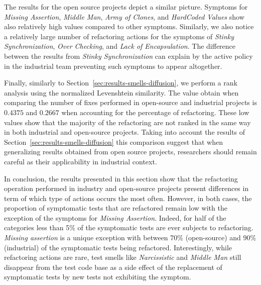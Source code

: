 The results for the open source projects depict a similar picture. Symptoms for \emph{Missing Assertion}, \emph{Middle Man}, \emph{Army of Clones}, and \emph{HardCoded Values} show also relatively high values compared to other symptoms. Similarly, we also notice a relatively large number of refactoring actions for the symptoms of \emph{Stinky Synchronization}, \emph{Over Checking}, and \emph{Lack of Encapsulation}. The difference between the results from \emph{Stinky Synchronization} can explain by the active policy in the industrial team preventing such symptoms to appear altogether.

Finally, similarly to Section~\ref{sec:results-smells-diffusion}, we perform a rank analysis using the normalized Levenshtein similarity. The value obtain when comparing the number of fixes performed in open-source and industrial projects is $0.4375$ and $0.2667$ when accounting for the percentage of refactoring. These low values show that the majority of the refactoring are not ranked in the same way in both industrial and open-source projects. Taking into account the results of Section~\ref{sec:results-smells-diffusion} this comparison suggest that when generalizing results obtained from open source projects, researchers should remain careful as their applicability in industrial context.

In conclusion, the results presented in this section show that the refactoring operation performed in industry and open-source projects present differences in term of which type of actions occurs the most often. However, in both cases, the proportion of symptomatic tests that are refactored remain low with the exception of the symptoms for \emph{Missing Assertion}. Indeed, for half of the categories less than 5\% of the symptomatic tests are ever subjects to refactoring. \emph{Missing assertion} is a unique exception with between 70\% (open-source) and 90\% (industrial) of the symptomatic tests being refactored. Interestingly, while refactoring actions are rare, test smells like \emph{Narcissistic} and \emph{Middle Man} still disappear from the test code base as a side effect of the replacement of symptomatic tests by new tests not exhibiting the symptom.